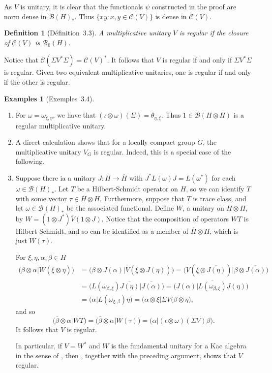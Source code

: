 \documentclass[a4paper,12pt]{article}
\theoremstyle{plain}
\newtheorem{definition}[proposition]{Definition}
\theoremstyle{definition}
\newtheorem{examples}[proposition]{Examples}
\newcommand{\mc}{\mathcal}
\begin{document}
As $V$ is unitary, it is clear that the functionals $\psi$ constructed in
the proof are norm dense in $\mc B(H)_*$.  Thus $\{ xy: x,y\in\mc C(V) \}$
is dense in $\mc C(V)$.

\begin{definition}[D\'efinition~3.3]
A multiplicative unitary $V$ is \emph{regular} if the closure of
$\mc C(V)$ is $\mc B_0(H)$.
\end{definition}

Notice that $\mc C(\Sigma V^* \Sigma) = \mc C(V)^*$.  It follows that
$V$ is regular if and only if $\Sigma V^* \Sigma$ is regular.  Given two
equivalent multiplicative unitaries, one is regular if and only if the other
is regular.

\begin{examples}[Exemples~3.4]\label{eg:2}
\begin{enumerate}
\item For $\omega=\omega_{\xi,\eta}$, we have that
$(\iota\otimes\omega)(\Sigma) = \theta_{\eta,\xi}$.
Thus $1\in\mc B(H\otimes H)$ is a regular multiplicative unitary.
\item A direct calculation shows that for a locally compact group $G$,
the multiplicative unitary $V_G$ is regular.  Indeed, this is a special
case of the following.
\item Suppose there ia a unitary $J:H\rightarrow \overline{H}$ with
$J^* \overline{L(\omega)} J = L(\omega^*)$ for each $\omega\in\mc B(H)_*$.
Let $T$ be a Hilbert-Schmidt operator on $H$, so we can identify $T$ with
some vector $\tau\in\overline{H} \otimes H$.  Furthermore, suppose that $T$
is trace class, and let $\omega\in\mc B(H)_*$ be the associated functional.
Define $W$, a unitary on $\overline{H} \otimes H$, by $W = (1\otimes J^*)
\overline{V} (1\otimes J)$.  Notice that the composition of operators
$WT$ is Hilbert-Schmidt, and so can be identified as a member of
$\overline H\otimes H$, which is just $W(\tau)$.

For $\xi,\eta,\alpha,\beta\in H$
\begin{align*}
\big( \overline\beta \otimes \alpha \big| W(\overline\xi\otimes\eta) \big)
&= \big( \overline\beta \otimes J(\alpha) \big|
   \overline{V} (\overline\xi\otimes J(\eta)) \big)
= \big( V(\xi\otimes\overline{J(\eta)}) \big|
   \beta\otimes\overline{J(\alpha)} \big) \\
&= \big( L(\omega_{\beta,\xi})\overline{J(\eta)} \big|
   \overline{J(\alpha)} \big)
= \big( J(\alpha) \big| \overline{L(\omega_{\beta,\xi})} J(\eta) \big) \\
&= \big( \alpha \big| L(\omega_{\xi,\beta}) \eta \big)
= \big( \alpha\otimes\xi \big| \Sigma V(\beta\otimes\eta \big),
\end{align*}
and so
\[ \big( \overline\beta\otimes\alpha \big| WT \big)
= \big( \overline\beta\otimes\alpha \big| W(\tau) \big)
= \big( \alpha \big| (\iota\otimes\omega)(\Sigma V) \beta \big). \]
It follows that $V$ is regular.

In particular, if $V=W^*$ and $W$ is the fundamental unitary for a
Kac algebra in the sense of \cite{r6}, then \cite[Lemme~2.2.3]{r6},
together with the preceding argument, shows that $V$ regular.
\end{enumerate}
\end{examples}
\end{document}
